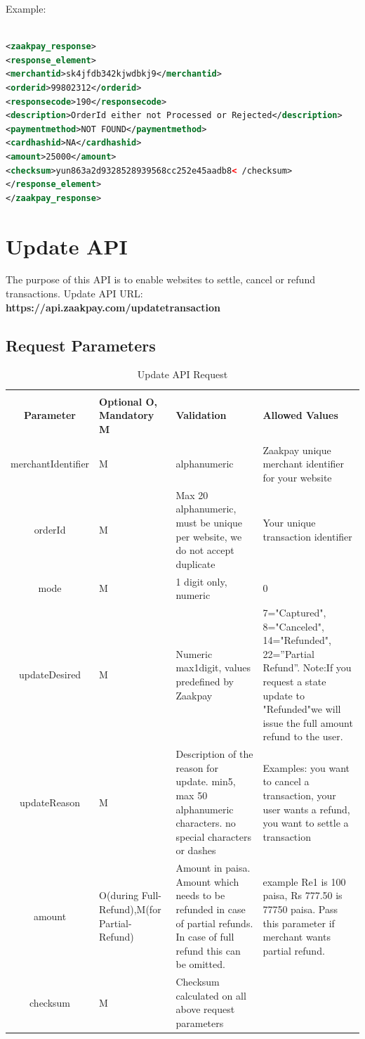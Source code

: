 \documentclass{article}
\begin{document}
Example:

\begin{lstlisting}[language=xml,breaklines=true]

<zaakpay_response>
<response_element>
<merchantid>sk4jfdb342kjwdbkj9</merchantid>
<orderid>99802312</orderid>
<responsecode>190</responsecode>
<description>OrderId either not Processed or Rejected</description>
<paymentmethod>NOT FOUND</paymentmethod>
<cardhashid>NA</cardhashid>
<amount>25000</amount>
<checksum>yun863a2d9328528939568cc252e45aadb8< /checksum>
</response_element>
</zaakpay_response>
\end{lstlisting}

\newpage
\section{Update API}
The purpose of this API is to enable websites to settle, cancel or refund transactions.
Update API URL: {\bfseries https://api.zaakpay.com/updatetransaction}
\subsection{Request Parameters}

\begin{longtable}{||c| p{2.09cm}| p{5.5cm}| p{4.7cm}||}
\rowcolor{white}
    \caption{Update API Request}\\
\rowcolor{green!50}
\bfseries{Parameter} & \bfseries{Optional O, Mandatory M} & \bfseries{Validation} & \bfseries{Allowed Values} \\ \hline
&&&\\
merchantIdentifier & M & alphanumeric & Zaakpay unique
merchant identifier for your website \\
orderId & M & Max 20 alphanumeric, must be unique per
website, we do not accept duplicate & Your unique transaction identifier\\
mode & M & 1 digit only, numeric & 0\\
updateDesired & M & Numeric max1digit, values predefined by Zaakpay & 7="Captured", 8="Canceled", 14="Refunded", 22=”Partial Refund”. Note:If you request a state update to "Refunded"we will issue the full amount refund to the user.\\
updateReason & M & Description of the reason for update. min5, max 50 alphanumeric characters. no special characters or dashes & Examples: you want to cancel a transaction, your user wants a refund, you want to settle a transaction \\
amount & O(during Full-Refund),M(for Partial-Refund) & Amount in paisa. Amount which needs to be refunded in case of partial refunds. In case of full refund this can be omitted. & example Re1 is 100 paisa, Rs 777.50 is 77750 paisa. Pass this parameter if merchant wants partial refund.\\
checksum & M & Checksum calculated on all above request parameters & \\
\end{longtable}
\end{document}
